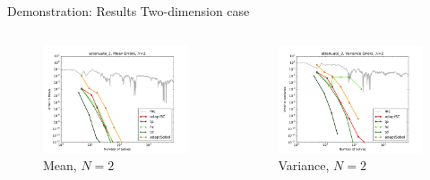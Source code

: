 \documentclass[t,9pt,svgnames]{beamer}
\begin{document}
\begin{frame}{Demonstration: Results}
  Two-dimension case
  \begin{columns}
    \begin{column}{0.5\textwidth}
      \begin{figure}
        \centering
        \includegraphics[width=\linewidth]{../../inputs/paul/attenuate_2_mean_errs}
        \caption{Mean, $N=2$}
      \end{figure}
    \end{column}
    \begin{column}{0.5\textwidth}
      \begin{figure}
        \centering
        \includegraphics[width=\linewidth]{../../inputs/paul/attenuate_2_variance_errs}
        \caption{Variance, $N=2$}
      \end{figure}
    \end{column}
  \end{columns}
\end{frame}
\end{document}
